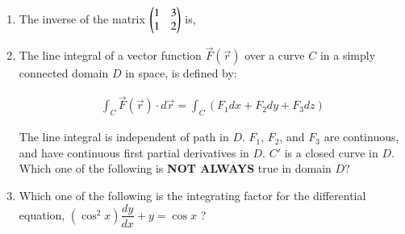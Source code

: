 \documentclass[journal,12pt,onecolumn]{IEEEtran}
\theoremstyle{remark}
\begin{document}
\begin{enumerate}
\item The inverse of the matrix $\begin{pmatrix} 1 & 3 \\ 1 & 2\end{pmatrix}$ is, 

\hfill{}

\begin{enumerate}
\end{enumerate}

\item The line integral of a vector function $\vec{F}(\vec{r})$ over a curve $C$ in a simply connected domain $D$ in space, is defined by: 

\hfill{}

\begin{align*}
\int_C \vec{F}(\vec{r}) \cdot d\vec{r} = \int_C (F_1 dx + F_2 dy + F_3 dz)
\end{align*}

The line integral is independent of path in $D$. $F_1$, $F_2$, and $F_3$ are continuous, and have continuous first partial derivatives in $D$. $C'$ is a closed curve in $D$.\\

\noindent
Which one of the following is \textbf{NOT ALWAYS} true in domain $D$?

\begin{enumerate}
\end{enumerate}

\item Which one of the following is the integrating factor  for the differential equation, $(\cos^2 x)\dfrac{dy}{dx} + y = \cos x$ ? 


\end{enumerate}
\end{document}
